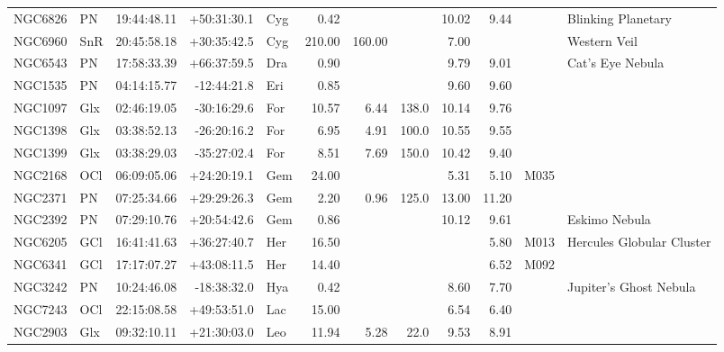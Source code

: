 \documentclass[11pt]{article}
\begin{document}
\begin{longtable}{llrrlrrrrrrl}
  NGC6826 & PN      & 19:44:48.11 & +50:31:30.1 & Cyg   & 0.42   &        &       & 10.02 & 9.44  &         & Blinking Planetary             \\
  NGC6960 & SnR     & 20:45:58.18 & +30:35:42.5 & Cyg   & 210.00 & 160.00 &       & 7.00  &       &         & Western Veil                   \\
  NGC6543 & PN      & 17:58:33.39 & +66:37:59.5 & Dra   & 0.90   &        &       & 9.79  & 9.01  &         & Cat's Eye Nebula               \\
  NGC1535 & PN      & 04:14:15.77 & -12:44:21.8 & Eri   & 0.85   &        &       & 9.60  & 9.60  &         &                                \\
  NGC1097 & Glx     & 02:46:19.05 & -30:16:29.6 & For   & 10.57  & 6.44   & 138.0 & 10.14 & 9.76  &         &                                \\
  NGC1398 & Glx     & 03:38:52.13 & -26:20:16.2 & For   & 6.95   & 4.91   & 100.0 & 10.55 & 9.55  &         &                                \\
  NGC1399 & Glx     & 03:38:29.03 & -35:27:02.4 & For   & 8.51   & 7.69   & 150.0 & 10.42 & 9.40  &         &                                \\
  NGC2168 & OCl     & 06:09:05.06 & +24:20:19.1 & Gem   & 24.00  &        &       & 5.31  & 5.10  & M035    &                                \\
  NGC2371 & PN      & 07:25:34.66 & +29:29:26.3 & Gem   & 2.20   & 0.96   & 125.0 & 13.00 & 11.20 &         &                                \\
  NGC2392 & PN      & 07:29:10.76 & +20:54:42.6 & Gem   & 0.86   &        &       & 10.12 & 9.61  &         & Eskimo Nebula                  \\
  NGC6205 & GCl     & 16:41:41.63 & +36:27:40.7 & Her   & 16.50  &        &       &       & 5.80  & M013    & Hercules Globular Cluster      \\
  NGC6341 & GCl     & 17:17:07.27 & +43:08:11.5 & Her   & 14.40  &        &       &       & 6.52  & M092    &                                \\
  NGC3242 & PN      & 10:24:46.08 & -18:38:32.0 & Hya   & 0.42   &        &       & 8.60  & 7.70  &         & Jupiter's Ghost Nebula         \\
  NGC7243 & OCl     & 22:15:08.58 & +49:53:51.0 & Lac   & 15.00  &        &       & 6.54  & 6.40  &         &                                \\
  NGC2903 & Glx     & 09:32:10.11 & +21:30:03.0 & Leo   & 11.94  & 5.28   & 22.0  & 9.53  & 8.91  &         &                                \\

\end{longtable}
\end{document}
